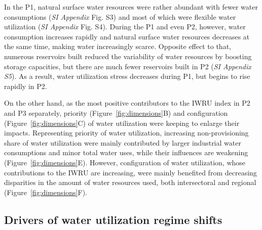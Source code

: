 \documentclass[9pt, twocolumn, twoside, lineno]{pnas-new}
\begin{document}
In the P1, natural surface water resources were rather abundant with fewer water consumptions (\textit{SI Appendix} Fig. S3) and most of which were flexible water utilization (\textit{SI Appendix} Fig. S4). During the P1 and even P2, however, water consumption increases rapidly and natural surface water resources decreases at the same time, making water increasingly scarce. Opposite effect to that, numerous reservoirs built reduced the variability of water resources by boosting storage capacities, but there are much fewer reservoirs built in P2 (\textit{SI Appendix S5}). As a result, water utilization stress decreases during P1, but begins to rise rapidly in P2.

On the other hand, as the most positive contributors to the IWRU index in P2 and P3 separately, priority (Figure~\ref{fig:dimensions}B) and configuration (Figure~\ref{fig:dimensions}C) of water utilization were keeping to enlarge their impacts. 
Representing priority of water utilization, increasing non-provisioning share of water utilization were mainly contributed by larger industrial water consumptions and minor total water uses, while their influences are weakening (Figure~\ref{fig:dimensions}E).
However, configuration of water utilization, whose contributions to the IWRU are increasing, were mainly benefited from decreasing disparities in the amount of water resources used, both intersectoral and regional (Figure~\ref{fig:dimensions}F).


\subsection*{Drivers of water utilization regime shifts}
\end{document}
